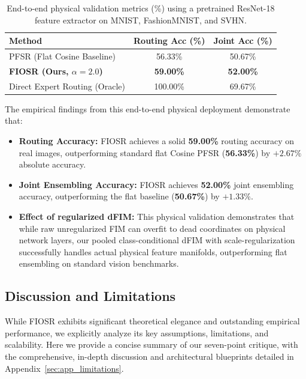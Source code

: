 \begin{table}[t]
\caption{End-to-end physical validation metrics (\%) using a pretrained ResNet-18 feature extractor on MNIST, FashionMNIST, and SVHN.}
\label{tab:resnet_results}
\begin{center}
\begin{small}
\begin{sc}
\begin{tabular}{lcc}
\toprule
Method & Routing Acc (\%) & Joint Acc (\%) \\
\midrule
PFSR (Flat Cosine Baseline) & 56.33\% & 50.67\% \\
\textbf{FIOSR (Ours, $\alpha=2.0$)} & \textbf{59.00\%} & \textbf{52.00\%} \\
\midrule
Direct Expert Routing (Oracle) & 100.00\% & 69.67\% \\
\bottomrule
\end{tabular}
\end{sc}
\end{small}
\end{center}
\end{table}

The empirical findings from this end-to-end physical deployment demonstrate that:
\begin{itemize}\setlength{\itemsep}{0.5pt}\setlength{\parskip}{0pt}
    \item \textbf{Routing Accuracy:} FIOSR achieves a solid \textbf{59.00\%} routing accuracy on real images, outperforming standard flat Cosine PFSR (\textbf{56.33\%}) by $+2.67\%$ absolute accuracy.
    \item \textbf{Joint Ensembling Accuracy:} FIOSR achieves \textbf{52.00\%} joint ensembling accuracy, outperforming the flat baseline (\textbf{50.67\%}) by $+1.33\%$.
    \item \textbf{Effect of regularized dFIM:} This physical validation demonstrates that while raw unregularized FIM can overfit to dead coordinates on physical network layers, our pooled class-conditional dFIM with scale-regularization successfully handles actual physical feature manifolds, outperforming flat ensembling on standard vision benchmarks.
\end{itemize}

\subsection{Discussion and Limitations}
\label{sec:discussion_limitations}

While FIOSR exhibits significant theoretical elegance and outstanding empirical performance, we explicitly analyze its key assumptions, limitations, and scalability. Here we provide a concise summary of our seven-point critique, with the comprehensive, in-depth discussion and architectural blueprints detailed in Appendix~\ref{sec:app_limitations}.

